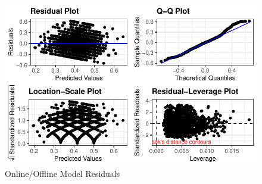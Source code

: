 \documentclass[]{interact}
\theoremstyle{plain}%
\theoremstyle{definition}
\theoremstyle{remark}
\begin{document}
\begin{figure}

{\centering \includegraphics{Social-Isolation-in-China_files/figure-pdf/fig-resids-online-offline-1.pdf}

}

\caption{\label{fig-resids-online-offline}Online/Offline Model
Residuals}

\end{figure}
\end{document}
